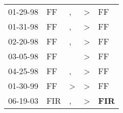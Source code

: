 \begin{supertabular}{p{0.07\textwidth}p{0.06\textwidth}p{0.02\textwidth}p{0.02\textwidth}p{0.06\textwidth}}
 01-29-98\textsuperscript{} &   FF\textsuperscript{} &             , &  \textgreater &            FF\textsuperscript{} \\
 01-31-98\textsuperscript{} &   FF\textsuperscript{} &             , &  \textgreater &            FF\textsuperscript{} \\
 02-20-98\textsuperscript{} &   FF\textsuperscript{} &             , &  \textgreater &            FF\textsuperscript{} \\
 03-05-98\textsuperscript{} &   FF\textsuperscript{} &               &  \textgreater &            FF\textsuperscript{} \\
 04-25-98\textsuperscript{} &   FF\textsuperscript{} &             , &  \textgreater &            FF\textsuperscript{} \\
 01-30-99\textsuperscript{} &   FF\textsuperscript{} &  \textgreater &  \textgreater &            FF\textsuperscript{} \\
 06-19-03\textsuperscript{} &  FIR\textsuperscript{} &             , &  \textgreater &  \textbf{FIR\textsuperscript{}} \\
\end{supertabular}
